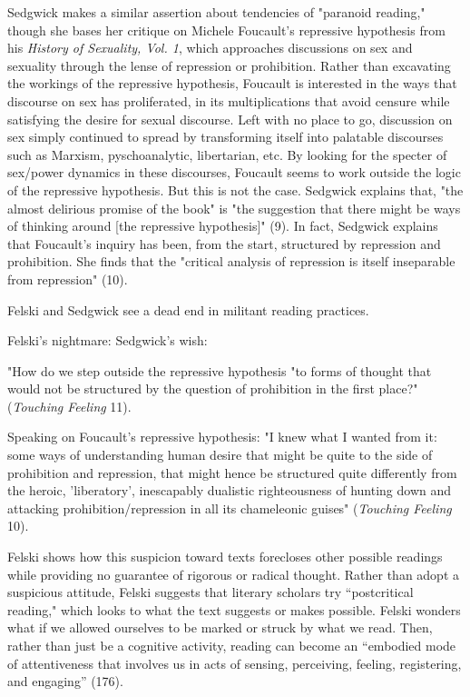 \documentclass[11pt]{article}
\begin{document}
\begin{enumerate}
Sedgwick makes a similar assertion about tendencies of "paranoid
reading," though she bases her critique on Michele Foucault's
repressive hypothesis from his \emph{History of Sexuality, Vol. 1}, which
approaches discussions on sex and sexuality through the lense of
repression or prohibition. Rather than excavating the workings of the
repressive hypothesis, Foucault is interested in the ways that
discourse on sex has proliferated, in its multiplications that avoid
censure while satisfying the desire for sexual discourse. Left with no
place to go, discussion on sex simply continued to spread by
transforming itself into palatable discourses such as Marxism,
pyschoanalytic, libertarian, etc. By looking for the specter of
sex/power dynamics in these discourses, Foucault seems to work outside
the logic of the repressive hypothesis. But this is not the
case. Sedgwick explains that, "the almost delirious promise of the
book" is "the suggestion that there might be ways of thinking around
[the repressive hypothesis]" (9). In fact, Sedgwick explains that
Foucault's inquiry has been, from the start, structured by repression
and prohibition. She finds that the "critical analysis of repression
is itself inseparable from repression" (10). 

Felski and Sedgwick see a dead end in militant reading practices. 

Felski's nightmare: 
Sedgwick's wish: 

"How do we step outside the repressive hypothesis "to forms of thought
that would not be structured by the question of prohibition in the
first place?" (\emph{Touching Feeling} 11).

Speaking on Foucault's repressive hypothesis: "I knew what I wanted
from it: some ways of understanding human desire that might be quite
to the side of prohibition and repression, that might hence be
structured quite differently from the heroic, 'liberatory',
inescapably dualistic righteousness of hunting down and attacking
prohibition/repression in all its chameleonic guises" (\emph{Touching
Feeling} 10).

Felski shows how this suspicion toward texts forecloses other possible
readings while providing no guarantee of rigorous or radical
thought. Rather than adopt a suspicious attitude, Felski suggests that
literary scholars try “postcritical reading," which looks to what the
text suggests or makes possible. Felski wonders what if we allowed
ourselves to be marked or struck by what we read. Then, rather than
just be a cognitive activity, reading can become an “embodied mode of
attentiveness that involves us in acts of sensing, perceiving,
feeling, registering, and engaging” (176).


\end{enumerate}
\end{document}
